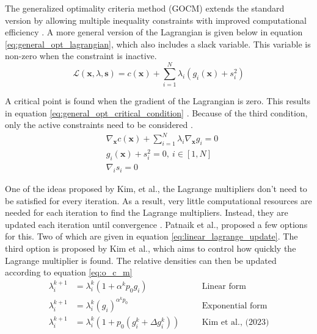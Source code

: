 The generalized optimality criteria method (GOCM) extends the standard version by allowing multiple inequality constraints with improved computational efficiency \cite{Kim_Dong_Weinberg_Dalidd_2021}. A more general version of the Lagrangian is given below in equation \ref{eq:general_opt_lagrangian}, which also includes a slack variable. This variable is non-zero when the constraint is inactive.
\begin{equation}
    \mathcal{L}(\mathbf{x},\lambda,\mathbf{s}) = c(\mathbf{x}) + \sum_{i=1}^N\lambda_i(g_i(\mathbf{x})+s_i^2)
    \label{eq:general_opt_lagrangian}
\end{equation}

A critical point is found when the gradient of the Lagrangian is zero. This results in equation \ref{eq:general_opt_critical_condition} \cite{Kim_Dong_Weinberg_Dalidd_2021}. Because of the third condition, only the active constraints need to be considered \cite{Kim_Dong_Weinberg_Dalidd_2021}.
\begin{equation}
    \begin{split}
        & \nabla_\mathbf{x}c(\mathbf{x}) + \sum_{i=1}^N\lambda_i\nabla_\mathbf{x}g_i = 0 \\
        & g_i(\mathbf{x})+s_i^2 = 0, \  i\in [1,N] \\
        & \nabla_i s_i = 0
    \end{split}
    \label{eq:general_opt_critical_condition}
\end{equation}

One of the ideas proposed by Kim, et al., the Lagrange multipliers don't need to be satisfied for every iteration. As a result, very little computational resources are needed for each iteration to find the Lagrange multipliers. Instead, they are updated each iteration until convergence \cite{Kim_Dong_Weinberg_Dalidd_2021}. Patnaik et al., \cite{Patnaik_Guptill_Berke_1995} proposed a few options for this. Two of which are given in equation \ref{eq:linear_lagrange_update}. The third option is proposed by Kim et al., \cite{Kim_Dong_Weinberg_Dalidd_2021} which aims to control how quickly the Lagrange multiplier is found. The relative densities can then be updated according to equation \ref{eq:o_c_m}
\begin{equation}
    \begin{alignedat}{2}
        \lambda_i^{k+1} &= \lambda_i^k(1+\alpha^kp_0g_i) \quad && \text{Linear form} \\
        \lambda_i^{k+1} &= \lambda_i^k(g_i)^{\alpha^kp_0} \quad && \text{Exponential form} \\
        \lambda_i^{k+1} &= \lambda_i^k(1+p_0(g_i^k + \Delta g_i^k)) \quad && \text{Kim et al., (2023)}
    \end{alignedat}
    \label{eq:linear_lagrange_update}
\end{equation}   

